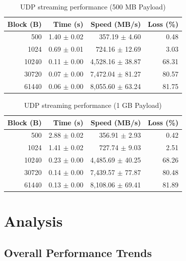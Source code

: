 \documentclass[12pt,a4paper]{article}
\begin{document}
\begin{table}[H]
    \centering
    \begin{tabular}{rrrr}
        \toprule
        \textbf{Block (B)} & \textbf{Time (s)} & \textbf{Speed (MB/s)} & \textbf{Loss (\%)} \\
        \midrule
        500 & 1.40 $\pm$ 0.02 & 357.19 $\pm$ 4.60 & 0.48 \\
        1024 & 0.69 $\pm$ 0.01 & 724.16 $\pm$ 12.69 & 3.03 \\
        10240 & 0.11 $\pm$ 0.00 & 4,528.16 $\pm$ 38.87 & 68.31 \\
        30720 & 0.07 $\pm$ 0.00 & 7,472.04 $\pm$ 81.27 & 80.57 \\
        61440 & 0.06 $\pm$ 0.00 & 8,055.60 $\pm$ 63.24 & 81.75 \\
        \bottomrule
    \end{tabular}
    \caption{UDP streaming performance (500 MB Payload)}
    \label{tab:udp_streaming_500mb}
\end{table}

\begin{table}[H]
    \centering
    \begin{tabular}{rrrr}
        \toprule
        \textbf{Block (B)} & \textbf{Time (s)} & \textbf{Speed (MB/s)} & \textbf{Loss (\%)} \\
        \midrule
        500 & 2.88 $\pm$ 0.02 & 356.91 $\pm$ 2.93 & 0.42 \\
        1024 & 1.41 $\pm$ 0.02 & 727.74 $\pm$ 9.03 & 2.51 \\
        10240 & 0.23 $\pm$ 0.00 & 4,485.69 $\pm$ 40.25 & 68.26 \\
        30720 & 0.14 $\pm$ 0.00 & 7,439.57 $\pm$ 77.87 & 80.48 \\
        61440 & 0.13 $\pm$ 0.00 & 8,108.06 $\pm$ 69.41 & 81.89 \\
        \bottomrule
    \end{tabular}
    \caption{UDP streaming performance (1 GB Payload)}
    \label{tab:udp_streaming_1gb}
\end{table}

\section{Analysis}

\subsection{Overall Performance Trends}
\end{document}
